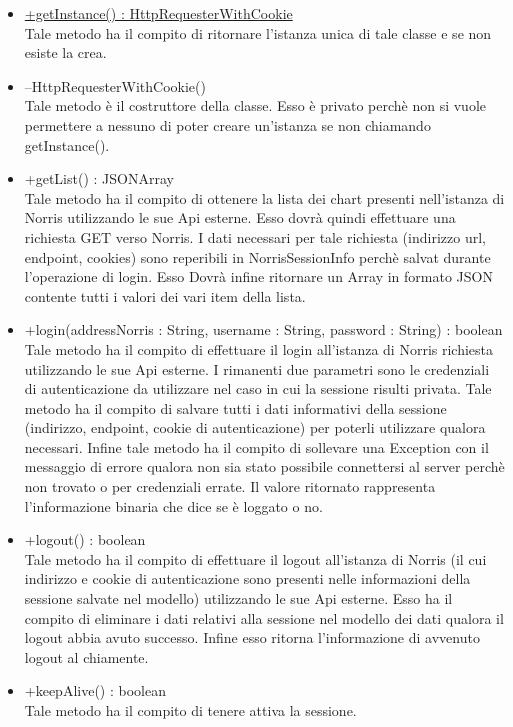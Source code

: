 \begin{itemize}
\begin{itemize}
					\item[\ding{111}] {\underline{+getInstance() : HttpRequesterWithCookie}} \\ [1mm] Tale metodo ha il compito di ritornare l'istanza unica di tale classe e se non esiste la crea.
					\item[\ding{111}] {{--HttpRequesterWithCookie()}} \\ [1mm] Tale metodo è il costruttore della classe. Esso è privato perchè non si vuole permettere a nessuno di poter creare un'istanza se non chiamando getInstance().
					\item[\ding{111}] {{+getList() : JSONArray}} \\ [1mm] Tale metodo ha il compito di ottenere la lista dei chart presenti nell'istanza di Norris utilizzando le sue Api esterne. Esso dovrà quindi effettuare una richiesta GET verso Norris. I dati necessari per tale richiesta (indirizzo url, endpoint, cookies) sono reperibili in NorrisSessionInfo perchè salvat durante l'operazione di login. Esso Dovrà infine ritornare un Array in formato JSON contente tutti i valori dei vari item della lista.
					\item[\ding{111}] {{+login(addressNorris : String, username : String, password : String) : boolean}} \\ [1mm] Tale metodo ha il compito di effettuare il login all'istanza di Norris richiesta utilizzando le sue Api esterne. I rimanenti due parametri sono le credenziali di autenticazione da utilizzare nel caso in cui la sessione risulti privata. Tale metodo ha il compito di salvare tutti i dati informativi della sessione (indirizzo, endpoint, cookie di autenticazione) per poterli utilizzare qualora necessari. Infine tale metodo ha il compito di sollevare una Exception con il messaggio di errore qualora non sia stato possibile connettersi al server perchè non trovato o per credenziali errate. Il valore ritornato rappresenta l'informazione binaria che dice se è loggato o no.
					\item[\ding{111}] {{+logout() : boolean}} \\ [1mm] Tale metodo ha il compito di effettuare il logout all'istanza di Norris (il cui indirizzo e cookie di autenticazione sono presenti nelle informazioni della sessione salvate nel modello) utilizzando le sue Api esterne. Esso ha il compito di eliminare i dati relativi alla sessione nel modello dei dati qualora il logout abbia avuto successo. Infine esso ritorna l'informazione di avvenuto logout al chiamente.
					\item[\ding{111}] {{+keepAlive() : boolean}} \\ [1mm] Tale metodo ha il compito di tenere attiva la sessione.

\end{itemize}
\end{itemize}
